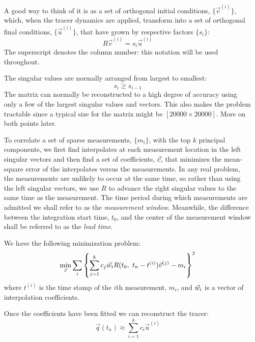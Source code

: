 \documentclass{article}
\begin{document}
A good way to think of it is as a set of orthogonal initial conditions,
$\lbrace \vec v^{(i)} \rbrace$, which, when the tracer dynamics are applied,
transform into a set of orthogonal final conditions, 
$\lbrace \vec u^{(i)} \rbrace$,
that have grown by respective factors $\lbrace s_i \rbrace$:
\begin{equation}
	R \vec v^{(i)} = s_i \vec u^{(i)}
\end{equation}
The superscript denotes the column number: 
this notation will be used throughout.

The singular values are normally arranged from largest to smallest:
\begin{equation}
	s_i \ge s_{i-1}
\end{equation}
The matrix can normally be reconstructed to a high degree of accuracy
using only a few of the largest singular values and vectors.
This also makes the problem tractable since a typical size for
the matrix might be $[20000\times20000]$. More on both points later.

To correlate a set of sparse measurements, $\lbrace m_i \rbrace$,
with the top $k$ principal components, we first find interpolates at each
measurement location in the left singular vectors and then find a set
of coefficients, $\vec c$, that minimizes the mean-square error of the
interpolates versus the measurements.
In any real problem, the measurements are unlikely to occur at the same time,
so rather than using the left singular vectors, we use $R$ to advance the
right singular values to the same time as the measurement.
The time period during which measurements are admitted we shall refer to as
the {\it measurement window}.
Meanwhile, the difference between the integration start time, $t_0$,
and the center of the measurement window shall be referred to as the
{\it lead time}.

We have the following minimization problem:
\begin{equation}
	\min_{\vec c} \sum_i \left \lbrace \sum_{j=1}^k c_j \vec w_i R(t_0, ~ t_n-t^{(i)}) \vec v^{(j)} - m_i \right \rbrace^2
\end{equation}
where $t^{(i)}$ is the time stamp of the $i$th measurement, $m_i$, 
and $\vec w_i$ is a vector of interpolation coefficients.

Once the coefficients have been fitted we can reconstruct the tracer:
\begin{equation}
	\vec q(t_n) \approx \sum_{i=1}^k c_i \vec u^{(i)}
\end{equation}
\end{document}

